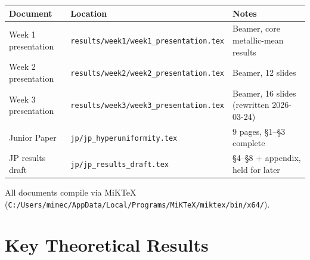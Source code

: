 \documentclass[11pt,letterpaper]{article}
\begin{document}
\noindent\begin{tabular}{lll}
\toprule
\textbf{Document} & \textbf{Location} & \textbf{Notes} \\
\midrule
Week 1 presentation & \texttt{results/week1/week1\_presentation.tex} & Beamer, core metallic-mean results \\
Week 2 presentation & \texttt{results/week2/week2\_presentation.tex} & Beamer, 12 slides \\
Week 3 presentation & \texttt{results/week3/week3\_presentation.tex} & Beamer, 16 slides (rewritten 2026-03-24) \\
Junior Paper        & \texttt{jp/jp\_hyperuniformity.tex}           & 9 pages, §1--§3 complete \\
JP results draft    & \texttt{jp/jp\_results\_draft.tex}            & §4--§8 + appendix, held for later \\
\bottomrule
\end{tabular}

\vspace{0.3em}\noindent All documents compile via MiKTeX
(\texttt{C:/Users/minec/AppData/Local/Programs/MiKTeX/miktex/bin/x64/}).

\section{Key Theoretical Results}
\end{document}
